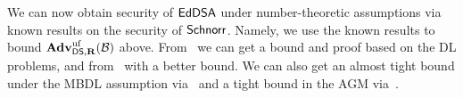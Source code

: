 %
%

We can now obtain security of $\mathsf{EdDSA}$ under number-theoretic assumptions via known results on the security of $\mathsf{Schnorr}$. Namely, we use the known results to bound $\mathbf{Adv}^{\mathrm{uf}}_{\mathsf{DS},\mathbf{R}}(\mathcal{B})$ above. From~\cite{JC:PoiSte00,EC:AABN02} we can get a bound and proof based on the DL problems, and from~\cite{C:RotSeg21} with a better bound. We can also get an almost tight bound under the MBDL assumption via~\cite{INDOCRYPT:BelDai20} and a tight bound in the AGM via~\cite{EC:FucPloSeu20}. 




